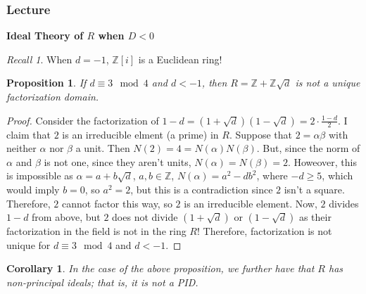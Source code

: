 \documentclass[12pt]{article}
\newtheorem{cor}[thm]{Corollary}
\newtheorem{prop}[thm]{Proposition}
\theoremstyle{definition}
\theoremstyle{remark}
\newtheorem*{rec}{Recall}
\numberwithin{equation}{section}
\newcommand\Z{\mathbb Z}    %
\begin{document}
\vspace{15pt}


\subsubsection{Lecture}

\textbf{Ideal Theory of $R$ when $D < 0$}

\begin{rec}
        When $d = -1$, $\Z[i]$ is a Euclidean ring!
\end{rec}

\vspace{15pt}

\begin{prop}
        If $d \equiv 3 \mod 4$ and $d < -1$, then $R = \Z+\Z\sqrt{d}$ is not a unique factorization domain.
\end{prop}
\begin{proof}
        Consider the factorization of $1-d = (1+\sqrt{d})(1-\sqrt{d}) = 2\cdot \frac{1-d}{2}$. I claim that $2$ is an irreducible elment (a prime) in $R$. Suppose that $2 = \alpha\beta$ with neither $\alpha$ nor $\beta$ a unit. Then $N(2) = 4 = N(\alpha)N(\beta)$. But, since the norm of $\alpha$ and $\beta$ is not one, since they aren't units, $N(\alpha) = N(\beta) = 2$. Howeover, this is impossible as $\alpha = a+b\sqrt{d}$, $a,b \in \Z$, $N(\alpha) = a^2-db^2$, where $-d \geq 5$, which would imply $b = 0$, so $a^2 = 2$, but this is a contradiction since $2$ isn't a square. Therefore, $2$ cannot factor this way, so $2$ is an irreducible element. Now, $2$ divides $1-d$ from above, but $2$ does not divide $(1+\sqrt{d})$ or $(1-\sqrt{d})$ as their factorization in the field is not in the ring $R$! Therefore, factorization is not unique for $d \equiv 3 \mod 4$ and $d < -1$. 
\end{proof}

\vspace{15pt}

\begin{cor}
        In the case of the above proposition, we further have that $R$ has non-principal ideals; that is, it is not a PID.
\end{cor}

\vspace{15pt}
\end{document}
